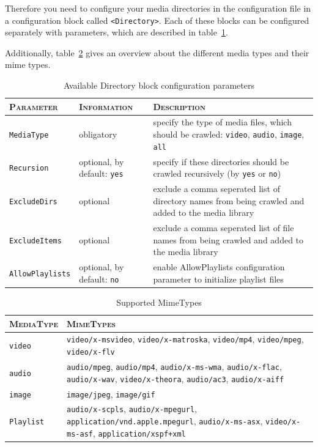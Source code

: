 \documentclass[a4paper,oneside,10pt]{report}
\begin{document}
Therefore you need to configure your media directories in the configuration file in a configuration block called \verb|<Directory>|. Each of these blocks can be configured separately with parameters, which are described in table~\ref{tab:AvailableDirectoryParams}.

Additionally, table~\ref{tab:supportedMediaTypes} gives an overview about the different media types and their mime types.

\begin{table}
	\centering
	\begin{tabular}{|p{7em}|p{6em}|p{18em}|}
		\hline
		\textsc{Parameter} & \textsc{Information} & \textsc{Description}\\
		\hline
		\hline
		\verb|MediaType| & obligatory & specify the type of media files, which should be crawled: \verb|video|, \verb|audio|, \verb|image|, \verb|all| \\
		\hline
		\verb|Recursion| & optional, by default: \verb|yes| & specify if these directories should be crawled recursively (by \verb|yes| or \verb|no|) \\
		\hline
		\verb|ExcludeDirs| & optional & exclude a comma seperated list of directory names from being crawled and added to the media library \\
		\hline
		\verb|ExcludeItems| & optional & exclude a comma seperated list of file names from being crawled and added to the media library \\
		\hline
		\verb|AllowPlaylists| & optional, by default: \verb|no|& enable AllowPlaylists configuration parameter to initialize playlist files \\
		\hline
	\end{tabular}
	\caption{Available Directory block configuration parameters}
	\label{tab:AvailableDirectoryParams}
\end{table}

\begin{table}
	\centering
	\begin{tabular}{|p{7em}|p{25em}|}
		\hline
		\textsc{MediaType} & \textsc{MimeTypes}\\
		\hline
		\hline
		\verb|video| & \verb|video/x-msvideo|, \verb|video/x-matroska|, \verb|video/mp4|, \verb|video/mpeg|, \verb|video/x-flv| \\
		\hline
		\verb|audio| & \verb|audio/mpeg|, \verb|audio/mp4|, \verb|audio/x-ms-wma|, \verb|audio/x-flac|, \verb|audio/x-wav|, \verb|video/x-theora|, \verb|audio/ac3|, \verb|audio/x-aiff| \\
		\hline
		\verb|image| & \verb|image/jpeg|, \verb|image/gif| \\
		\hline
		\verb|Playlist| & \verb|audio/x-scpls|, \verb|audio/x-mpegurl|, \verb|application/vnd.apple.mpegurl|, \verb|audio/x-ms-asx|, \verb|video/x-ms-asf|, \verb|application/xspf+xml| \\
		\hline
	\end{tabular}
	\caption{Supported MimeTypes}
	\label{tab:supportedMediaTypes}
\end{table}
\end{document}

